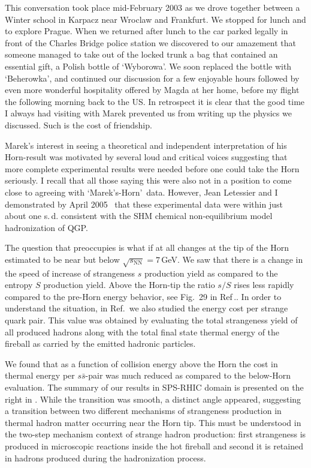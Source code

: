 \documentclass{appolb}
\begin{document}
This conversation took place mid-February 2003 as we drove together between a Winter school in Karpacz near Wroclaw and Frankfurt. We stopped for lunch and to explore Prague. When we returned after lunch to the car parked legally in front of the Charles Bridge police station we discovered to our amazement that someone managed to take out of the locked trunk a bag that contained an essential gift, a Polish bottle of \lq Wyborowa\rq. We soon replaced the bottle with \lq Beherowka\rq, and continued our discussion for a few enjoyable hours followed by even more wonderful hospitality offered by Magda at her home, before my flight the following morning back to the US. In retrospect it is clear that the good time I always had visiting with Marek prevented us from writing up the physics we discussed. Such is the cost of friendship.
 
Marek\rq s interest in seeing a theoretical and independent interpretation of his Horn-result was motivated by several loud and critical voices suggesting that more complete experimental results were needed before one could take the Horn seriously. I recall that all those saying this were also not in a position to come close to agreeing with \lq Marek\rq s-Horn\rq\ data. However, Jean Letessier and I demonstrated by April 2005~\cite{Letessier:2005qe} that these experimental data were within just about one s.\,d. consistent with the SHM chemical non-equilibrium model hadronization of QGP. 

The question that preoccupies is what if at all changes at the tip of the Horn estimated  to be near but below $\sqrt{s_\mathrm{NN}}=7$\,GeV. We saw that there is a change in the speed of increase of strangeness $s$ production yield as compared to the entropy $S$ production yield. Above the Horn-tip the ratio $s/S$ rises less rapidly compared to the pre-Horn energy behavior, see Fig.~29 in Ref\,.\cite{Rafelski:2015cxa}. In order to understand the situation, in Ref.\,\cite{Letessier:2005qe} we also studied the energy cost per strange quark pair. This value was obtained by evaluating the total strangeness yield of all produced hadrons along with the total final state thermal energy of the fireball as carried by the emitted hadronic particles. 

We found that as a function of collision energy above the Horn the cost in thermal energy per $s\bar s$-pair was much reduced as compared to the below-Horn evaluation. The summary of our results in SPS-RHIC domain is presented on the right in . While the transition was smooth, a distinct angle appeared, suggesting a transition between two different mechanisms of strangeness production in thermal hadron matter occurring near the Horn tip. This must be understood in the two-step mechanism context of strange hadron production: first strangeness is produced in microscopic reactions inside the hot fireball and second it is retained in hadrons produced during the hadronization process. 
 
\end{document}
